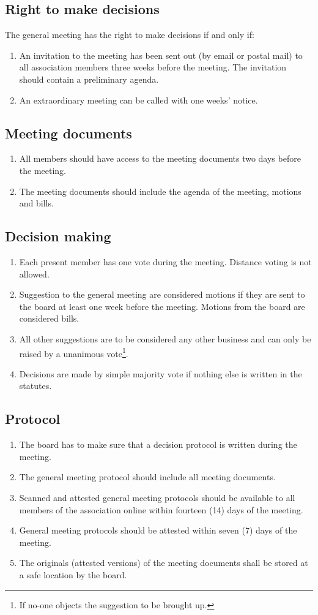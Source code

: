 \subsection{Right to make decisions}
The general meeting has the right to make decisions if and only if:
\begin{enumerate}
  \item An invitation to the meeting has been sent out (by email or postal mail) to all association members three weeks before the meeting. The invitation should contain a preliminary agenda.
  \item An extraordinary meeting can be called with one weeks’ notice. 
\end{enumerate}
\subsection{Meeting documents} \label{sec:regMeetingDocs}
\begin{enumerate}
  \item All members should have access to the meeting documents two days before the meeting. 
  \item The meeting documents should include the agenda of the meeting, motions and bills.
\end{enumerate}
\subsection{Decision making}
\begin{enumerate}
  \item Each present member has one vote during the meeting. Distance voting is not allowed.
  \item Suggestion to the general meeting are considered motions if they are sent to the board at least one week before the meeting. Motions from the board are considered bills.
  \item All other suggestions are to be considered any other business and can only be raised by a unanimous vote\footnote{If no-one objects the suggestion to be brought up.}.
  \item Decisions are made by simple majority vote if nothing else is written in the statutes. 
\end{enumerate}
\subsection{Protocol}
\begin{enumerate}
  \item The board has to make sure that a decision protocol is written during the meeting.
  \item The general meeting protocol should include all meeting documents.
  \item Scanned and attested general meeting protocols should be available to all members of the association online within fourteen (14) days of the meeting.
  \item General meeting protocols should be attested within seven (7) days of the meeting.
  \item The originals (attested versions) of the meeting documents shall be stored at a safe location by the board. 
\end{enumerate}


